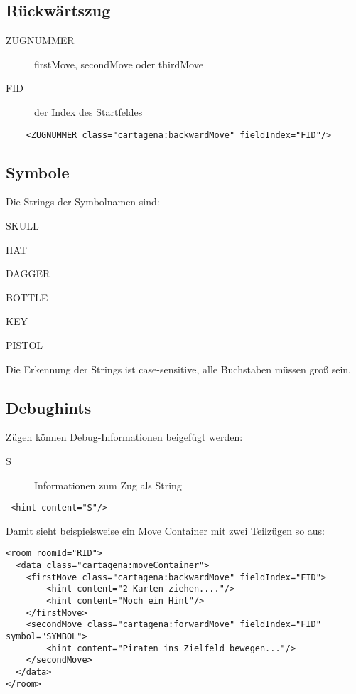 \documentclass[12pt,a4paper, ngerman, oneside]{scrartcl}
\begin{document}
\subsection{Rückwärtszug}
\label{backwardMove}
\begin{description}
\item[ZUGNUMMER] firstMove, secondMove oder thirdMove
\item[FID] der Index des Startfeldes
\end{description}
\begin{verbatim}
	<ZUGNUMMER class="cartagena:backwardMove" fieldIndex="FID"/>
\end{verbatim}


\subsection{\label{symbols}Symbole}

Die Strings der Symbolnamen sind:
\begin{compactenum}
\item SKULL
\item HAT
\item DAGGER
\item BOTTLE
\item KEY
\item PISTOL
\end{compactenum}
Die Erkennung der Strings ist case-sensitive, alle Buchstaben müssen groß
sein.
\subsection{Debughints}
Zügen können Debug-Informationen beigefügt werden:
\begin{description}
\item[S] Informationen zum Zug als String
\end{description}
\begin{verbatim}
 <hint content="S"/>
\end{verbatim}
Damit sieht beispielsweise ein Move Container mit zwei Teilzügen so aus:
\begin{verbatim}
<room roomId="RID">
  <data class="cartagena:moveContainer">
    <firstMove class="cartagena:backwardMove" fieldIndex="FID">
     	<hint content="2 Karten ziehen...."/>
     	<hint content="Noch ein Hint"/>
    </firstMove>
    <secondMove class="cartagena:forwardMove" fieldIndex="FID" symbol="SYMBOL">
    	<hint content="Piraten ins Zielfeld bewegen..."/>
    </secondMove>
  </data>
</room>
\end{verbatim}
\end{document}
